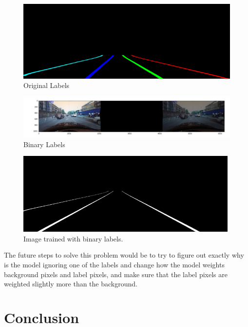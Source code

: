 \documentclass[twoside,twocolumn]{article}
\begin{document}
\begin{figure}
  \includegraphics[width=\linewidth]{7.png}
  \caption{Original Labels}
  \label{fig:labels1}
\end{figure}

\begin{figure}
  \includegraphics[width=\linewidth]{8.png}
  \caption{Binary Labels}
  \label{fig:labels2}
\end{figure}

\begin{figure}
  \includegraphics[width=\linewidth]{9.png}
  \caption{Image trained with binary labels.}
  \label{fig:badbad}
\end{figure}

\par The future steps to solve this problem would be to try to figure out exactly why is the model ignoring one of the labels and change how the model weights background pixels and label pixels, and make sure that the label pixels are weighted slightly more than the background.


\section{Conclusion}

\end{document}
